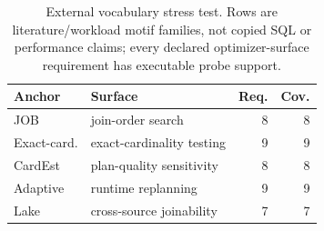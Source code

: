 \begin{table}[t]
\centering
\caption{External vocabulary stress test. Rows are literature/workload motif families, not copied SQL or performance claims; every declared optimizer-surface requirement has executable probe support.}
\label{tab:external-crosswalk}
\footnotesize
\setlength{\tabcolsep}{2.5pt}
\begin{tabular}{@{}p{0.60in}p{1.28in}rr@{}}
\toprule
Anchor & Surface & Req. & Cov. \\
\midrule
JOB & join-order search & 8 & 8 \\
Exact-card. & exact-cardinality testing & 9 & 9 \\
CardEst & plan-quality sensitivity & 8 & 8 \\
Adaptive & runtime replanning & 9 & 9 \\
Lake & cross-source joinability & 7 & 7 \\
\bottomrule
\end{tabular}
\end{table}
